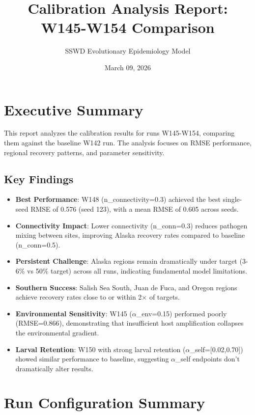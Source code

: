 \documentclass[11pt]{article}
\title{Calibration Analysis Report: W145-W154 Comparison}
\author{SSWD Evolutionary Epidemiology Model}
\date{March 09, 2026}
\begin{document}
\maketitle

\section{Executive Summary}

This report analyzes the calibration results for runs W145-W154, comparing them against the baseline W142 run. The analysis focuses on RMSE performance, regional recovery patterns, and parameter sensitivity.

\subsection{Key Findings}

\begin{itemize}
\item \textbf{Best Performance}: W148 (n\_connectivity=0.3) achieved the best single-seed RMSE of 0.576 (seed 123), with a mean RMSE of 0.605 across seeds.
\item \textbf{Connectivity Impact}: Lower connectivity (n\_conn=0.3) reduces pathogen mixing between sites, improving Alaska recovery rates compared to baseline (n\_conn=0.5).
\item \textbf{Persistent Challenge}: Alaska regions remain dramatically under target (3-6\% vs 50\% target) across all runs, indicating fundamental model limitations.
\item \textbf{Southern Success}: Salish Sea South, Juan de Fuca, and Oregon regions achieve recovery rates close to or within 2× of targets.
\item \textbf{Environmental Sensitivity}: W145 ($\alpha$\_env=0.15) performed poorly (RMSE=0.866), demonstrating that insufficient host amplification collapses the environmental gradient.
\item \textbf{Larval Retention}: W150 with strong larval retention ($\alpha$\_self=[0.02,0.70]) showed similar performance to baseline, suggesting $\alpha$\_self endpoints don't dramatically alter results.
\end{itemize}

\section{Run Configuration Summary}
\end{document}

